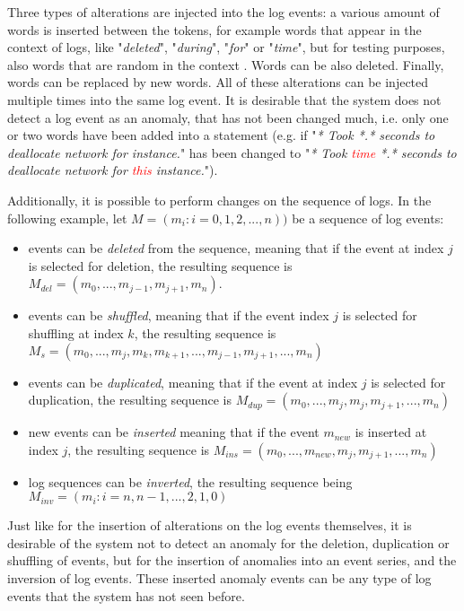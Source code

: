 Three types of alterations are injected into the log events: a various amount of words is inserted between the tokens, for example words that appear in the context of logs, like "\textit{deleted}", "\textit{during}", "\textit{for}" or "\textit{time}", but for testing purposes, also words that are random in the context . Words can be also deleted. Finally, words can be replaced by new words. All of these alterations can be injected multiple times into the same log event. It is desirable that the system does not detect a log event as an anomaly, that has not been changed much, i.e. only one or two words have been added into a statement (e.g. if "\textit{* Took *.* seconds to deallocate network for instance.}" has been changed to "\textit{* Took \textcolor{red}{time} *.* seconds to deallocate network for \textcolor{red}{this} instance.}").

Additionally, it is possible to perform changes on the sequence of logs. In the following example, let $M = (m_i : i = 0, 1, 2, ..., n))$ be a sequence of log events:
\begin{itemize}
	\setlength\itemsep{-0.5em}
	\item events can be \textit{deleted} from the sequence, meaning that if the event at index $j$ is selected for deletion, the resulting sequence is $M_{del} = (m_0, ..., m_{j-1}, m_{j+1}, m_n)$.
	\item events can be \textit{shuffled}, meaning that if the event index $j$ is selected for shuffling at index $k$, the resulting sequence is $M_s = (m_0, ..., m_j, m_k, m_{k+1}, ..., m_{j-1}, m_{j+1}, ..., m_n)$
	\item events can be \textit{duplicated}, meaning that if the event at index $j$ is selected for duplication, the resulting sequence is $M_{dup} = (m_0, ..., m_j, m_j, m_{j+1}, ..., m_n)$
	\item new events can be \textit{inserted} meaning that if the event $m_{new}$ is inserted at index $j$, the resulting sequence is $M_{ins} = (m_0, ..., m_{new}, m_j, m_{j+1}, ..., m_n)$
	\item log sequences can be \textit{inverted}, the resulting sequence being $M_{inv} = (m_i : i = n, n-1, ..., 2, 1, 0)$
\end{itemize}

Just like for the insertion of alterations on the log events themselves, it is desirable of the system not to detect an anomaly for the deletion, duplication or shuffling of events, but for the insertion of anomalies into an event series, and the inversion of log events. These inserted anomaly events can be any type of log events that the system has not seen before.


